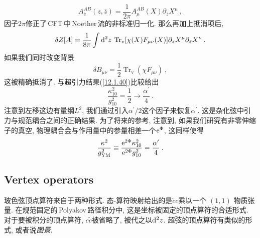 \begin{equation}
    A_{\bar{z}}^{AB}(z,\bar{z})=\frac{1}{2\pi}A_{\mu}^{AB}(X)\partial_{\bar{z}}X^{\mu} \:, \label{12.3.33}
\end{equation}
因子$ 2\pi $修正了\,CFT\,中\,Noether\,流的非标准归一化. 那么再加上抵消项后,
\begin{equation}
    \delta Z[A] = \frac{1}{8\pi}\int \mathrm{d}^{2}z\: \operatorname{Tr}_{\mathrm{v}}[\chi(X)F_{\mu\nu}(X)]\partial_{z}X^{\mu}\partial_{\bar{z}}X^{\nu} \:. \label{12.3.34}
\end{equation}
如果我们同时改变背景
\begin{equation}
    \delta B_{\mu\nu} = \frac{1}{2}\operatorname{Tr}_{\mathrm{v}}(\chi F_{\mu\nu}) \:, \label{12.3.35}
\end{equation}
这被精确抵消了. 与超引力结果(\ref{12.1.40})比较给出
\begin{equation}
    \frac{\kappa_{10}^{2}}{g_{10}^{2}} = \frac{1}{2} \to \frac{\alpha^{\prime}}{4} \:. \label{12.3.36}
\end{equation}
注意到左移这边有量纲$ L^{2}$, 我们通过引入$ \alpha^{\prime}/2 $这个因子来恢复$ \alpha^{\prime}$. 这是杂化弦中引力与规范耦合之间的正确结果. 为了将来的参考, 注意到, 如果我们研究有非零伸缩子的真空, 物理耦合会与作用量中的参量相差一个$ \mathrm{e}^{\Phi}$, 这同样使得
\begin{equation}
    \frac{\kappa^{2}}{g^{2}_{\mathrm{YM}}} \equiv \frac{\mathrm{e}^{2\Phi}\kappa_{10}^{2}}{\mathrm{e}^{2\Phi}g_{10}^{2}}=\frac{\alpha^{\prime}}{4} \:. \label{12.3.37}
\end{equation}

\subsection*{Vertex operators}

玻色弦顶点算符来自于两种形式. 态-算符映射给出的是$ \tilde{c}c $乘以一个 $(1,1)$ 物质张量. 在规范固定的\,Polyakov\,路径积分中, 这是坐标被固定的顶点算符的合适形式. 对于要被积分的顶点算符, $c\tilde{c} $被省略了, 被代之以$ \mathrm{d}^{2}z$. 超弦的顶点算符有类似的形式, 或者说{\emph{图景}}.

